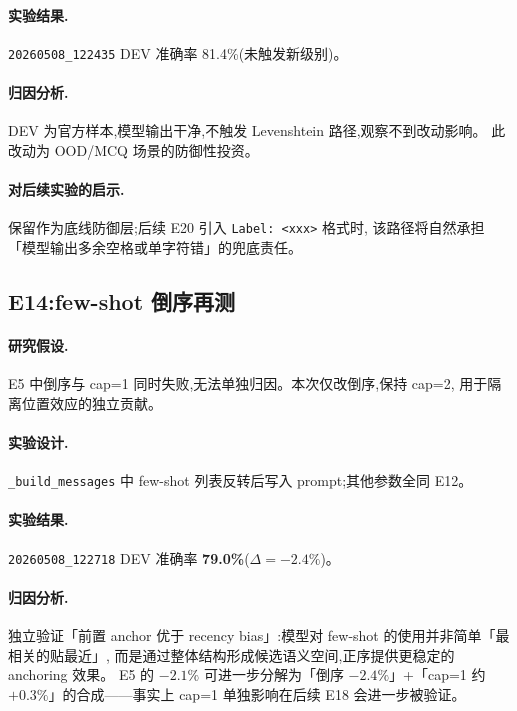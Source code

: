 \documentclass[11pt,a4paper]{ctexart}
\begin{document}
\paragraph{实验结果.}\texttt{20260508\_122435} DEV 准确率 81.4\%(未触发新级别)。

\paragraph{归因分析.}DEV 为官方样本,模型输出干净,不触发 Levenshtein 路径,观察不到改动影响。
此改动为 OOD/MCQ 场景的防御性投资。

\paragraph{对后续实验的启示.}保留作为底线防御层;后续 E20 引入 \verb|Label: <xxx>| 格式时,
该路径将自然承担「模型输出多余空格或单字符错」的兜底责任。

\subsection{E14:few-shot 倒序再测}

\paragraph{研究假设.}E5 中倒序与 cap=1 同时失败,无法单独归因。本次仅改倒序,保持 cap=2,
用于隔离位置效应的独立贡献。

\paragraph{实验设计.}\texttt{\_build\_messages} 中 few-shot 列表反转后写入 prompt;其他参数全同 E12。

\paragraph{实验结果.}\texttt{20260508\_122718} DEV 准确率 \textbf{79.0\%}($\Delta = -2.4\%$)。

\paragraph{归因分析.}独立验证「前置 anchor 优于 recency bias」:模型对 few-shot 的使用并非简单「最相关的贴最近」,
而是通过整体结构形成候选语义空间,正序提供更稳定的 anchoring 效果。
E5 的 $-2.1\%$ 可进一步分解为「倒序 $-2.4\%$」+「cap=1 约 $+0.3\%$」的合成——事实上 cap=1 单独影响在后续 E18 会进一步被验证。
\end{document}
